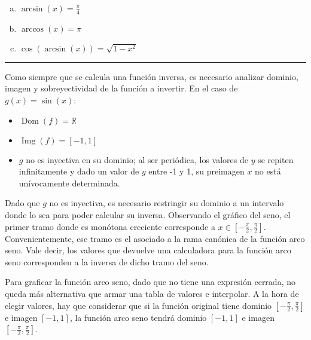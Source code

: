 \documentclass{article}
\begin{document}
\begin{enumerate}[(a)]

\bfseries

\item $ \arcsin(x) = \frac{\pi}{4} $

\item $ \arccos(x) = \pi $

\item $ \cos( \arcsin(x) ) = \sqrt{1 - x^2} $

\end{enumerate}

\hrule
\vspace{1em}

Como siempre que se calcula una función inversa, es necesario analizar dominio, imagen y sobreyectividad de la función a invertir. En el caso de $ g(x) = \sin(x) $:

\begin{itemize}

\item $ \mathop{\text{Dom}}(f) = \mathbb{R} $

\item $ \mathop{\text{Img}}(f) = [-1, 1] $

\item $ g $ no es inyectiva en su dominio; al ser periódica, los valores de $ y $ se repiten infinitamente y dado un valor de $y$ entre -1 y 1, su preimagen $x$ no está unívocamente determinada.

\end{itemize}

Dado que $ g $ no es inyectiva, es necesario restringir su dominio a un intervalo donde lo sea para poder calcular su inversa. Observando el gráfico del seno, el primer tramo donde es monótona creciente corresponde a $ x \in \left[-\frac{\pi}{2}, \frac{\pi}{2} \right] $. Convenientemente, ese tramo es el asociado a la rama canónica de la función arco seno. Vale decir, los valores que devuelve una calculadora para la función arco seno corresponden a la inversa de dicho tramo del seno.

Para graficar la función arco seno, dado que no tiene una expresión cerrada, no queda más alternativa que armar una tabla de valores e interpolar. A la hora de elegir valores, hay que considerar que si la función original tiene dominio $ \left[-\frac{\pi}{2}, \frac{\pi}{2} \right] $ e imagen $[-1, 1]$, la función arco seno tendrá dominio $[-1, 1]$ e imagen $ \left[-\frac{\pi}{2}, \frac{\pi}{2} \right] $.
\end{document}
